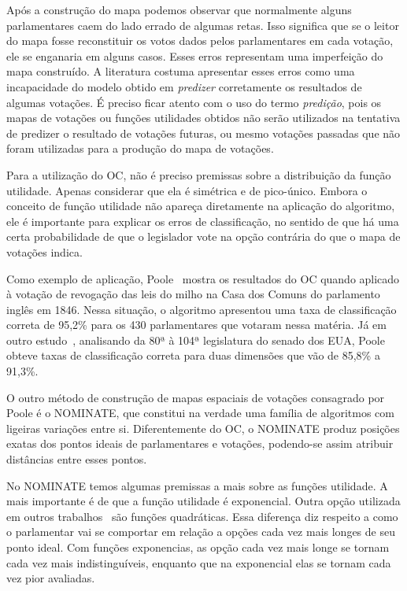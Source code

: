 \documentclass[a4paper, 12pt]{article}
\newcommand\nominate{NOMINATE\xspace}
\begin{document}
Após a construção do mapa podemos observar que normalmente alguns parlamentares caem do lado errado de algumas retas. Isso significa que se o leitor do mapa fosse reconstituir os votos dados pelos parlamentares em cada votação, ele se enganaria em alguns casos. Esses erros representam uma imperfeição do mapa construído. A literatura costuma apresentar esses erros como uma incapacidade do modelo obtido em \emph{predizer} corretamente os resultados de algumas votações. É preciso ficar atento com o uso do termo \emph{predição}, pois os mapas de votações ou funções utilidades obtidos não serão utilizados na tentativa de predizer o resultado de votações futuras, ou mesmo votações passadas que não foram utilizadas para a produção do mapa de votações. 

Para a utilização do OC, não é preciso premissas sobre a distribuição da função utilidade. Apenas considerar que ela é simétrica e de pico-único. Embora o conceito de função utilidade não apareça diretamente na aplicação do algoritmo, ele é importante para explicar os erros de classificação, no sentido de que há uma certa probabilidade de que o legislador vote na opção contrária do que o mapa de votações indica.

Como exemplo de aplicação, Poole~\cite{poole2005book} mostra os resultados do OC quando aplicado à votação de revogação das leis do milho na Casa dos Comuns do parlamento inglês em 1846. Nessa situação, o algoritmo apresentou uma taxa de classificação correta de 95,2\% para os 430 parlamentares que votaram nessa matéria. Já em outro estudo~\cite{poole-rosenthal2000}, analisando da 80ª à 104ª legislatura do senado dos EUA, Poole obteve taxas de classificação correta para duas dimensões que vão de 85,8\% a 91,3\%.

O outro método de construção de mapas espaciais de votações consagrado por Poole é o \nominate, que constitui na verdade uma família de algoritmos com ligeiras variações entre si. Diferentemente do OC, o \nominate produz posições exatas dos pontos ideais de parlamentares e votações, podendo-se assim atribuir distâncias entre esses pontos. 

No \nominate temos algumas premissas a mais sobre as funções utilidade. A mais importante é de que a função utilidade é exponencial. Outra opção utilizada em outros trabalhos~\cite{clinton2004ideal} são funções quadráticas. Essa diferença diz respeito a como o parlamentar vai se comportar em relação a opções cada vez mais longes de seu ponto ideal. Com funções exponencias, as opção cada vez mais longe se tornam cada vez mais indistinguíveis, enquanto que na exponencial elas se tornam cada vez pior avaliadas.
\end{document}
